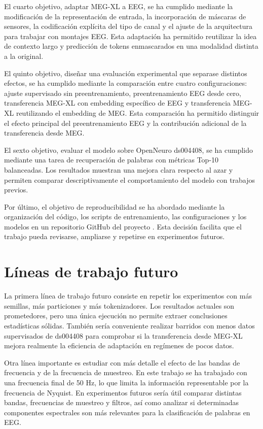 El cuarto objetivo, adaptar MEG-XL a EEG, se ha cumplido mediante la modificación de la representación de entrada, la incorporación de máscaras de sensores, la codificación explícita del tipo de canal y el ajuste de la arquitectura para trabajar con montajes EEG. Esta adaptación ha permitido reutilizar la idea de contexto largo y predicción de tokens enmascarados en una modalidad distinta a la original.

El quinto objetivo, diseñar una evaluación experimental que separase distintos efectos, se ha cumplido mediante la comparación entre cuatro configuraciones: ajuste supervisado sin preentrenamiento, preentrenamiento EEG desde cero, transferencia MEG-XL con embedding específico de EEG y transferencia MEG-XL reutilizando el embedding de MEG. Esta comparación ha permitido distinguir el efecto principal del preentrenamiento EEG y la contribución adicional de la transferencia desde MEG.

El sexto objetivo, evaluar el modelo sobre OpenNeuro ds004408, se ha cumplido mediante una tarea de recuperación de palabras con métricas Top-10 balanceadas. Los resultados muestran una mejora clara respecto al azar y permiten comparar descriptivamente el comportamiento del modelo con trabajos previos.

Por último, el objetivo de reproducibilidad se ha abordado mediante la organización del código, los scripts de entrenamiento, las configuraciones y los modelos en un repositorio GitHub del proyecto \cite{scrabrain_github}. Esta decisión facilita que el trabajo pueda revisarse, ampliarse y repetirse en experimentos futuros.

\section{Líneas de trabajo futuro}

La primera línea de trabajo futuro consiste en repetir los experimentos con más semillas, más particiones y más tokenizadores. Los resultados actuales son prometedores, pero una única ejecución no permite extraer conclusiones estadísticas sólidas. También sería conveniente realizar barridos con menos datos supervisados de ds004408 para comprobar si la transferencia desde MEG-XL mejora realmente la eficiencia de adaptación en regímenes de pocos datos.

Otra línea importante es estudiar con más detalle el efecto de las bandas de frecuencia y de la frecuencia de muestreo. En este trabajo se ha trabajado con una frecuencia final de 50 Hz, lo que limita la información representable por la frecuencia de Nyquist. En experimentos futuros sería útil comparar distintas bandas, frecuencias de muestreo y filtros, así como analizar si determinadas componentes espectrales son más relevantes para la clasificación de palabras en EEG.


